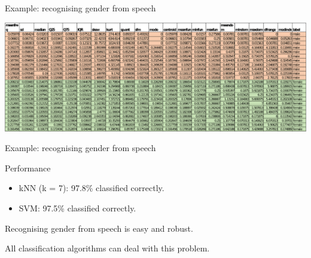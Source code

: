 \documentclass[compress]{beamer}
\begin{document}
\begin{frame}{Example: recognising gender from speech}

    \begin{center}
        \includegraphics[width=\linewidth]{vector-gender-voice}
    \end{center}
\end{frame}

\begin{frame}{Example: recognising gender from speech}

Performance

\begin{itemize}

\item kNN (k = 7): 97.8\% classified correctly.
\item SVM: 97.5\% classified correctly.
\end{itemize}

Recognising gender from speech is easy and robust.

All classification algorithms can deal with this problem.

\end{frame}
\end{document}
